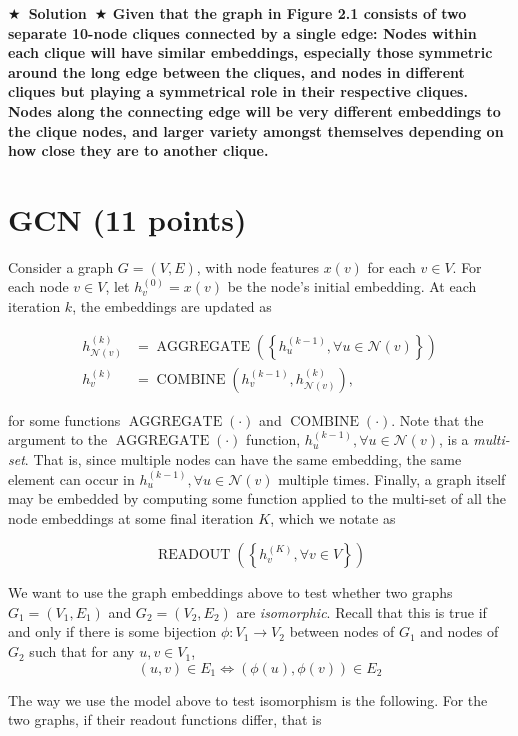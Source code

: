\documentclass{article}
\numberwithin{figure}{section}
\newcommand{\Solution}[1]{{\medskip \color{red} \bf $\bigstar$~\sf \textbf{Solution}~$\bigstar$ \sf #1 } \bigskip}
\begin{document}
\Solution{Given that the graph in Figure 2.1 consists of two separate 10-node cliques connected by a single edge:
Nodes within each clique will have similar embeddings, especially those symmetric around the long edge between the cliques, and nodes in different cliques but playing a symmetrical role in their respective cliques.
Nodes along the connecting edge will be very different embeddings to the clique nodes, and larger variety amongst themselves depending on how close they are to another clique.}


\section{GCN (11 points)}

Consider a graph $G = (V, E)$, with node features $x(v)$ for each $v \in V$. For each node $v \in V$, let $h^{(0)}_v = x(v)$ be the node’s initial embedding. At each iteration $k$, the embeddings are updated as 

$$
\begin{aligned}
h_{\mathcal{N}(v)}^{(k)} & =\operatorname{AGGREGATE}\left(\left\{h_u^{(k-1)}, \forall u \in \mathcal{N}(v)\right\}\right) \\
h_v^{(k)} & =\operatorname{COMBINE}\left(h_v^{(k-1)}, h_{\mathcal{N}(v)}^{(k)}\right),
\end{aligned}
$$

\noindent for some functions $\operatorname{AGGREGATE}(\cdot)$ and $\operatorname{COMBINE}(\cdot)$. Note that the argument to the $\operatorname{AGGREGATE}(\cdot)$ function, ${h^{(k-1)}_u, \forall u \in \mathcal{N}(v)}$, is a \textit{multi-set}.
That is, since multiple nodes can have the same embedding, the same element can occur in ${h^{(k-1)}_u, \forall u \in \mathcal{N}(v)}$ multiple times.
Finally, a graph itself may be embedded by computing some function applied to the multi-set of all the node embeddings at some final iteration $K$, which we notate as 

$$\operatorname { READOUT }\left(\left\{h_v^{(K)}, \forall v \in V\right\}\right)$$

We want to use the graph embeddings above to test whether two graphs $G_1 = (V_1, E_1)$ and $G_2 = (V_2, E_2)$ are \textit{isomorphic}.
Recall that this is true if and only if there is some bijection $\phi : V_1 \rightarrow V_2$ between nodes of $G_1$ and nodes of $G_2$ such that for any $u, v \in V_1$, 
$$(u, v) \in E_1 \Leftrightarrow (\phi(u), \phi(v)) \in E_2$$

The way we use the model above to test isomorphism is the following. For the two graphs, if their readout functions differ, that is 
\end{document}
